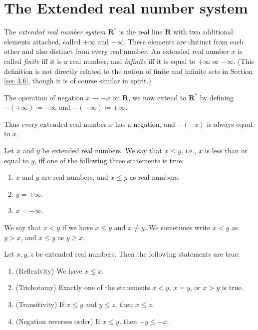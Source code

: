 \section{The Extended real number system}\label{sec 6.2}

\begin{definition}\label{6.2.1}
The \emph{extended real number system \(\mathbf{R}^*\)} is the real line \(\mathbf{R}\) with two additional elements attached, called \(+\infty\) and \(-\infty\).
These elements are distinct from each other and also distinct from every real number.
An extended real number \(x\) is called \emph{finite} iff it is a real number, and \emph{infinite} iff it is equal to \(+\infty\) or \(-\infty\).
(This definition is not directly related to the notion of finite and infinite sets in Section \ref{sec 3.6}, though it is of course similar in spirit.)
\end{definition}

\begin{definition}\label{6.2.2}
The operation of negation \(x \to -x\) on \(\mathbf{R}\), we now extend to \(\mathbf{R}^*\) by defining \(-(+\infty) \coloneqq -\infty\) and \(-(-\infty) \coloneqq +\infty\).
\end{definition}

\begin{note}
Thus every extended real number \(x\) has a negation, and \(-(-x)\) is always equal to \(x\).
\end{note}

\begin{definition}\label{6.2.3}
Let \(x\) and \(y\) be extended real numbers.
We say that \(x \leq y\), i.e., \(x\) is less than or equal to \(y\), iff one of the following three statements is true:
\begin{enumerate}
    \item \(x\) and \(y\) are real numbers, and \(x \leq y\) as real numbers.
    \item \(y = +\infty\).
    \item \(x = -\infty\).
\end{enumerate}
We say that \(x < y\) if we have \(x \leq y\) and \(x \neq y\).
We sometimes write \(x < y\) as \(y > x\), and \(x \leq y\) as \(y \geq x\).
\end{definition}

\setcounter{theorem}{4}
\begin{proposition}\label{6.2.5}
Let \(x, y, z\) be extended real numbers.
Then the following statements are true:
\begin{enumerate}
    \item (Reflexivity)
    We have \(x \leq x\).
    \item (Trichotomy)
    Exactly one of the statements \(x < y\), \(x = y\), or \(x > y\) is true.
    \item (Transitivity)
    If \(x \leq y\) and \(y \leq z\), then \(x \leq z\).
    \item (Negation reverses order) If \(x \leq y\), then \(-y \leq -x\).
\end{enumerate}
\end{proposition}

